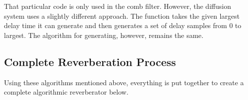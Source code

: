 That particular code is only used in the comb filter. However, the diffusion system uses
a slightly different approach. The function takes the given largest delay time it can generate
and then generates a set of delay samples from 0 to largest. The algorithm for generating,
however, remains the same.

\subsection{Complete Reverberation Process}

Using these algorithms mentioned above, everything is put together to create a
complete algorithmic reverberator below.


